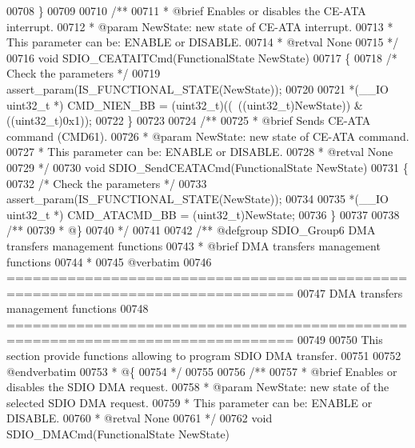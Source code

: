 \begin{DoxyCode}
00708 \}
00709 
00710 \textcolor{comment}{/**}
00711 \textcolor{comment}{  * @brief  Enables or disables the CE-ATA interrupt.}
00712 \textcolor{comment}{  * @param  NewState: new state of CE-ATA interrupt. }
00713 \textcolor{comment}{  *         This parameter can be: ENABLE or DISABLE.}
00714 \textcolor{comment}{  * @retval None}
00715 \textcolor{comment}{  */}
00716 \textcolor{keywordtype}{void} SDIO_CEATAITCmd(FunctionalState NewState)
00717 \{
00718   \textcolor{comment}{/* Check the parameters */}
00719   assert_param(IS\_FUNCTIONAL\_STATE(NewState));
00720 
00721   *(\_\_IO uint32\_t *) CMD_NIEN_BB = (uint32\_t)((~((uint32\_t)NewState)) & ((uint32\_t)0x1));
00722 \}
00723 
00724 \textcolor{comment}{/**}
00725 \textcolor{comment}{  * @brief  Sends CE-ATA command (CMD61).}
00726 \textcolor{comment}{  * @param  NewState: new state of CE-ATA command. }
00727 \textcolor{comment}{  *         This parameter can be: ENABLE or DISABLE.}
00728 \textcolor{comment}{  * @retval None}
00729 \textcolor{comment}{  */}
00730 \textcolor{keywordtype}{void} SDIO_SendCEATACmd(FunctionalState NewState)
00731 \{
00732   \textcolor{comment}{/* Check the parameters */}
00733   assert_param(IS\_FUNCTIONAL\_STATE(NewState));
00734 
00735   *(\_\_IO uint32\_t *) CMD_ATACMD_BB = (uint32\_t)NewState;
00736 \}
00737 
00738 \textcolor{comment}{/**}
00739 \textcolor{comment}{  * @\}}
00740 \textcolor{comment}{  */}
00741 
00742 \textcolor{comment}{/** @defgroup SDIO\_Group6 DMA transfers management functions}
00743 \textcolor{comment}{ *  @brief   DMA transfers management functions}
00744 \textcolor{comment}{ *}
00745 \textcolor{comment}{@verbatim   }
00746 \textcolor{comment}{ ===============================================================================}
00747 \textcolor{comment}{              DMA transfers management functions}
00748 \textcolor{comment}{ ===============================================================================  }
00749 \textcolor{comment}{}
00750 \textcolor{comment}{  This section provide functions allowing to program SDIO DMA transfer.}
00751 \textcolor{comment}{}
00752 \textcolor{comment}{@endverbatim}
00753 \textcolor{comment}{  * @\{}
00754 \textcolor{comment}{  */}
00755 
00756 \textcolor{comment}{/**}
00757 \textcolor{comment}{  * @brief  Enables or disables the SDIO DMA request.}
00758 \textcolor{comment}{  * @param  NewState: new state of the selected SDIO DMA request.}
00759 \textcolor{comment}{  *          This parameter can be: ENABLE or DISABLE.}
00760 \textcolor{comment}{  * @retval None}
00761 \textcolor{comment}{  */}
00762 \textcolor{keywordtype}{void} SDIO_DMACmd(FunctionalState NewState)

\end{DoxyCode}
